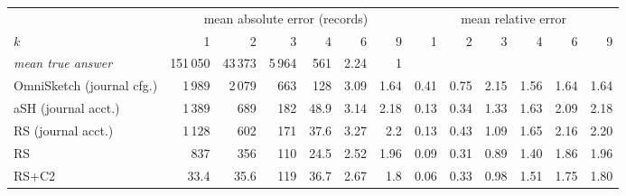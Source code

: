 \begin{tabular}{lrrrrrrrrrrrr}
\toprule
 & \multicolumn{6}{c}{mean absolute error (records)} & \multicolumn{6}{c}{mean relative error} \\
$k$ & 1 & 2 & 3 & 4 & 6 & 9 & 1 & 2 & 3 & 4 & 6 & 9 \\
\midrule
\emph{mean true answer} & 151\,050 & 43\,373 & 5\,964 & 561 & 2.24 & 1 &  &  &  &  &  &  \\
\midrule
OmniSketch (journal cfg.) & 1\,989 & 2\,079 & 663 & 128 & 3.09 & 1.64 & 0.41 & 0.75 & 2.15 & 1.56 & 1.64 & 1.64 \\
aSH (journal acct.) & 1\,389 & 689 & 182 & 48.9 & 3.14 & 2.18 & 0.13 & 0.34 & 1.33 & 1.63 & 2.09 & 2.18 \\
RS (journal acct.) & 1\,128 & 602 & 171 & 37.6 & 3.27 & 2.2 & 0.13 & 0.43 & 1.09 & 1.65 & 2.16 & 2.20 \\
RS & 837 & 356 & 110 & 24.5 & 2.52 & 1.96 & 0.09 & 0.31 & 0.89 & 1.40 & 1.86 & 1.96 \\
RS+C2 & 33.4 & 35.6 & 119 & 36.7 & 2.67 & 1.8 & 0.06 & 0.33 & 0.98 & 1.51 & 1.75 & 1.80 \\
\bottomrule
\end{tabular}
